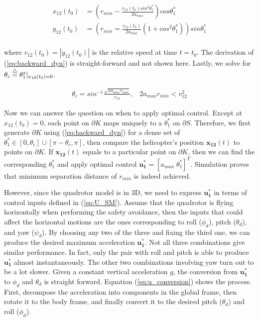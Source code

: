 \documentclass[journal,11pt,onecolumn,draftclsnofoot,]{IEEEtran}
\begin{document}
\begin{equation}
\label{eq:backward_dyn}
\begin{split}
x_{12}(t_0) &= \left( r_{min} - \frac{v_{12}(t_0)sin^2\theta_1^*}{2a_{max}} \right) cos\theta_1^* \\
y_{12}(t_0) &= \left( r_{min} = \frac{v_{12}(t_0)}{2a_{max}} \left( 1+cos^2\theta_1^* \right) \right) sin\theta_1^* \\
\end{split}
\end{equation}

where $v_{12}(t_0)=|\dot{y}_{12}(t_0)|$ is the relative speed at time $t=t_0$. The derivation of  (\ref{eq:backward_dyn}) is straight-forward and not shown here. Lastly, we solve for $\theta_c \buildrel\triangle\over = \theta_1^*|_{x_{12}(t_0)=0}$.

\begin{equation}
\label{eq:theta_c}
\begin{split}
\theta_c = sin^{-1}\frac{\sqrt{2a_{max}r_{min}}}{v_{12}}, \;\;\; 2a_{max}r_{min}<v_{12}^2
\end{split}
\end{equation}

Now we can answer the question on when to apply optimal control. Except at $x_{12}(t_0)=0$, each point on $\partial K$ maps uniquely to a $\theta_1^*$ on $\partial S$. Therefore, we first generate $\partial K$ using (\ref{eq:backward_dyn}) for a dense set of $\theta_1^*\in[0,\theta_c] \cup [\pi-\theta_c,\pi]$, then compare the helicopter’s position $\boldsymbol{x_{12}}(t)$ to points on $\partial K$. If $\boldsymbol{x_{12}}(t)$  equals to a particular point on $\partial K$, then we can find the corresponding $\theta_1^*$ and apply  optimal control $\boldsymbol{u_1^*}=[a_{max} \; \theta_1^* ]^T$. Simulation proves that minimum separation distance of $r_{min}$ is indeed achieved.

However, since the quadrotor model is in 3D, we need to express $\boldsymbol{u_1^*}$ in terms of control inputs defined in (\ref{eq:U_SM}). Assume that the quadrotor is flying horizontally when performing the safety avoidance, then the inputs that could affect the horizontal motions are the ones corresponding to roll ($\phi_d$), pitch ($\theta_d$), and yaw ($\psi_d$). By choosing any two of the three and fixing the third one, we can produce the desired maximum acceleration $\boldsymbol{u_1^*}$. Not all three combinations give similar performance. In fact, only the pair with roll and pitch is able to produce $\boldsymbol{u_1^*}$ almost instantaneously. The other two combinations involving yaw turn out to be a lot slower. Given a constant vertical acceleration $g$, the conversion from $\boldsymbol{u_1^*}$ to $\phi_d$ and $\theta_d$ is straight forward. Equation (\ref{eq:u_conversion}) shows the process. First, decompose the acceleration into components in the global frame, then rotate it to the body frame, and finally convert it to the desired pitch ($\theta_d$) and roll ($\phi_d$).
\end{document}
